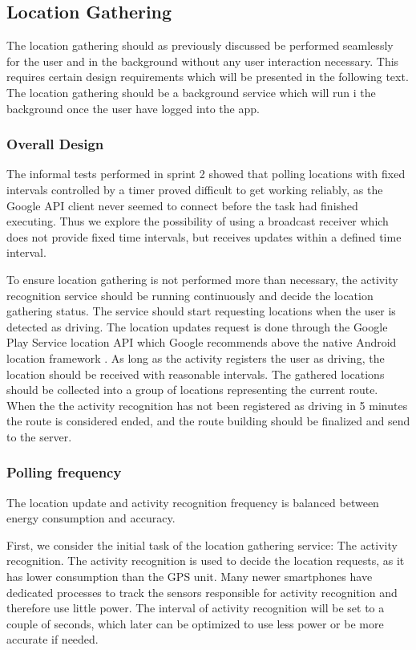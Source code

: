 \subsection{Location Gathering}
The location gathering should as previously discussed be performed seamlessly for the user and in the background without any user interaction necessary. 
This requires certain design requirements which will be presented in the following text. 
The location gathering should be a background service which will run i the background once the user have logged into the app. 


\subsubsection{Overall Design}
The informal tests performed in sprint 2 showed that polling locations with fixed intervals controlled by a timer proved difficult to get working reliably, as the Google API client never seemed to connect before the task had finished executing. 
Thus we explore the possibility of using a broadcast receiver which does not provide fixed time intervals, but receives updates within a defined time interval.

To ensure location gathering is not performed more than necessary, the activity recognition service should be running continuously and decide the location gathering status.
The service should start requesting locations when the user is detected as driving. 
The location updates request is done through the Google Play Service location API which Google recommends above the native Android location framework \cite{apploc}.
As long as the activity registers the user as driving, the location should be received with reasonable intervals.
The gathered locations should be collected into a group of locations representing the current route.
When the the activity recognition has not been registered as driving in 5 minutes the route is considered ended, and the route building should be finalized and send to the server.

\subsubsection{Polling frequency}
The location update and activity recognition frequency is balanced between energy consumption and accuracy.

First, we consider the initial task of the location gathering service: The activity recognition.
The activity recognition is used to decide the location requests, as it has lower consumption than the GPS unit. 
Many newer smartphones have dedicated processes to track the sensors responsible for activity recognition and therefore use little power.
The interval of activity recognition will be set to a couple of seconds, which later can be optimized to use less power or be more accurate if needed.


